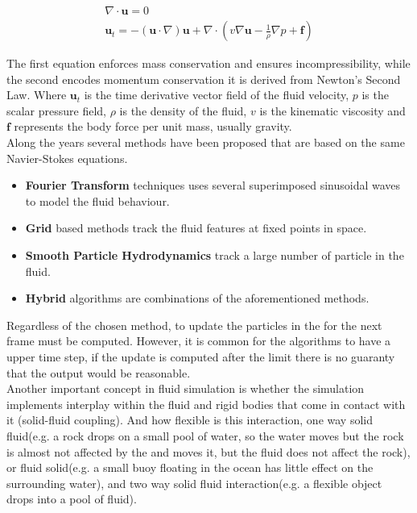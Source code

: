 \documentclass[11pt]{report}
\begin{document}
\begin{gather}
\label{eq:navierStokes1}
\nabla \cdot \mathbf{u} = 0\\
\label{eq:navierStokes2}
\mathbf{u}_t = -(\mathbf{u} \cdot \nabla)\mathbf{u} + \nabla \cdot ( v \nabla \mathbf{u} - \frac{1}{\rho} \nabla p + \mathbf{f} )
\end{gather}

The first equation enforces mass conservation and ensures incompressibility, while the second encodes momentum conservation it is derived from Newton's Second Law.
Where $\mathbf{u}_t$ is the time derivative vector field of the fluid velocity, $p$  is the scalar pressure field, $\rho$ is the density of the fluid, $v$ is the kinematic viscosity and $\mathbf{f}$ represents the body force per unit mass, usually gravity.\\

Along the years several methods have been proposed that are based on the same Navier-Stokes equations.

\begin{itemize}
\item \textbf{Fourier Transform} techniques uses several superimposed sinusoidal waves to model the fluid behaviour.
\item \textbf{Grid} based methods track the fluid features at fixed points in space.
\item \textbf{Smooth Particle Hydrodynamics} track a large number of particle in the fluid.
\item \textbf{Hybrid} algorithms are combinations of the aforementioned methods.\\
\end{itemize}

Regardless of the chosen method, to update the particles in the for the next frame must be computed.
However, it is common for the algorithms to have a upper time step, if the update is computed after the limit there is no guaranty that the output would be reasonable.\\

Another important concept in fluid simulation is whether the simulation implements interplay within the fluid and rigid bodies that come in contact with it (solid-fluid coupling).
And how flexible is this interaction, one way solid fluid(e.g. a rock drops on a small pool of water, so the water moves but the rock is almost not affected by the  and moves it, but the fluid does not affect the rock), or fluid solid(e.g. a small buoy floating in the ocean has little effect on the surrounding water), and two way solid fluid interaction(e.g. a flexible object drops into a pool of fluid).\\
\end{document}
